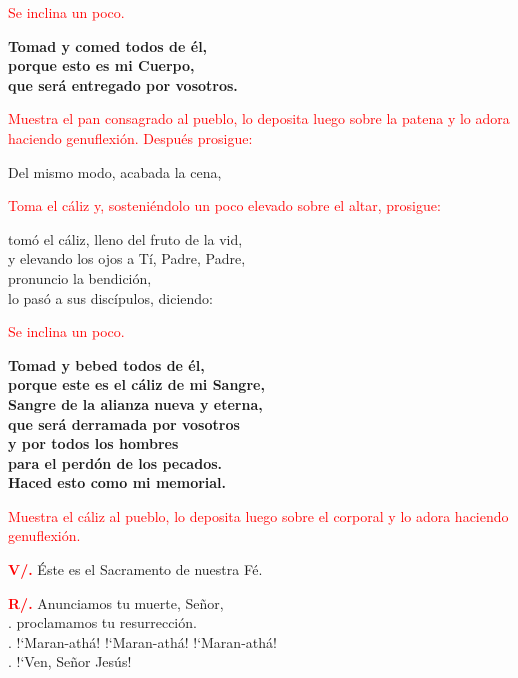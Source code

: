 \documentclass[12pt, letterpaper]{article}
\begin{document}
  \large{\textcolor{red}{Se inclina un poco.}} 

  \noindent
  \LARGE{\bfseries{Tomad y comed todos de \'el,\\
  porque esto es mi Cuerpo,\\
  que ser\'a entregado por vosotros.}}

  \large{\textcolor{red}{Muestra el pan consagrado al pueblo, lo deposita luego sobre la patena y lo adora haciendo genuflexi\'on. Despu\'es prosigue:}}

  \noindent
  \Large Del mismo modo, acabada la cena,

  \large{\textcolor{red}{Toma el c\'aliz y, sosteni\'endolo un poco elevado sobre el altar, prosigue:}}

  \noindent
  \Large tom\'o el c\'aliz, lleno del fruto de la vid,\\
  y elevando los ojos a T\'i, Padre, Padre,\\
  pronuncio la bendici\'on,\\
  lo pas\'o a sus disc\'ipulos, diciendo:

  \large{\textcolor{red}{Se inclina un poco.}}

  \noindent
  \LARGE{\bfseries{Tomad y bebed todos de \'el,\\
  porque este es el c\'aliz de mi Sangre,\\
  Sangre de la alianza nueva y eterna,\\
  que ser\'a derramada por vosotros\\ 
  y por todos los hombres\\
  para el perd\'on de los pecados.\\
  Haced esto como mi memorial.}}

  \large{\textcolor{red}{Muestra el c\'aliz al pueblo, lo deposita luego sobre el corporal y lo adora haciendo genuflexi\'on.}}

  \noindent
  \Large {\bfseries \textcolor{red}{V/.}} \hspace{0.5cm} \'Este es el Sacramento de nuestra F\'e.

  \noindent
  \Large {\bfseries \textcolor{red}{R/.}} \hspace{0.5cm} Anunciamos tu muerte, Se\~nor,\\
  . \hspace{1.5cm} proclamamos tu resurrecci\'on.\\
  . \hspace{1.5cm} !`Maran-ath\'a! !`Maran-ath\'a! !`Maran-ath\'a!\\
  . \hspace{1.5cm} !`Ven, Se\~nor Jes\'us!
\end{document}

